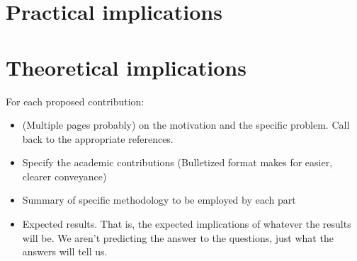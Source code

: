 \section{Practical implications}
\section{Theoretical implications}

For each proposed contribution:

\begin{itemize}
    \item (Multiple pages probably) on the motivation and the specific problem. Call back to the appropriate references.
    \item Specify the academic contributions (Bulletized format makes for easier, clearer conveyance)
    \item Summary of specific methodology to be employed by each part
    \item Expected results. That is, the expected implications of whatever the results will be. We aren't predicting the answer to the questions, just what the answers will tell us.
\end{itemize}